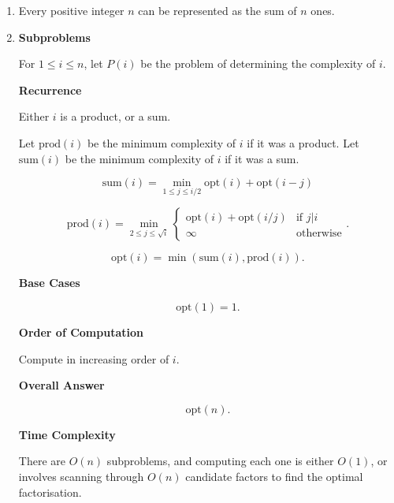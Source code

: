 \documentclass{article}
\begin{document}
\begin{solution}
\begin{enumerate}[label = (\alph*)]
    \item Every positive integer $n$ can be represented as the sum of $n$ ones.

    \item 

    \textbf{Subproblems}

For $1\leq i\leq n$, let $P(i)$ be the problem of determining the 
complexity of $i$.

\textbf{Recurrence}

Either $i$ is a product, or a sum.

Let $\mathrm{prod}(i)$ be the minimum complexity of $i$ if it was a product.
Let $\mathrm{sum}(i)$ be the minimum complexity of $i$ if it was a sum.

$$
\mathrm{sum}(i) = \min_{1\leq j\leq i/2} \mathrm{opt}(i) + \mathrm{opt}(i-j)
$$

$$
\mathrm{prod}(i) = \min_{2\leq j\leq \sqrt{i}}\begin{cases}
    \mathrm{opt}(i) + \mathrm{opt}(i/j) &\text{if $j|i$}\\
    \infty &\text{otherwise}
\end{cases}.
$$

$$
\mathrm{opt}(i)=\min(\mathrm{sum}(i), \mathrm{prod}(i)).
$$

\textbf{Base Cases}

$$\mathrm{opt}(1)=1.$$

\textbf{Order of Computation}

Compute in increasing order of $i$.

\pagebreak

\textbf{Overall Answer}

$$\mathrm{opt}(n).$$

\textbf{Time Complexity}

There are $O(n)$ subproblems, and computing each one is either $O(1)$, or involves scanning through $O(n)$
candidate factors to find the optimal factorisation.


\end{enumerate}
\end{solution}
\end{document}

